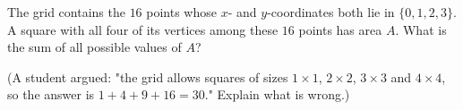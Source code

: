 The grid contains the $16$ points whose $x$- and $y$-coordinates both lie in $\{0,1,2,3\}$. A square with all four of its vertices among these $16$ points has area $A$. What is the sum of all possible values of $A$?

(A student argued: "the grid allows squares of sizes $1\times1$, $2\times2$, $3\times3$ and $4\times4$, so the answer is $1+4+9+16=30$." Explain what is wrong.)
